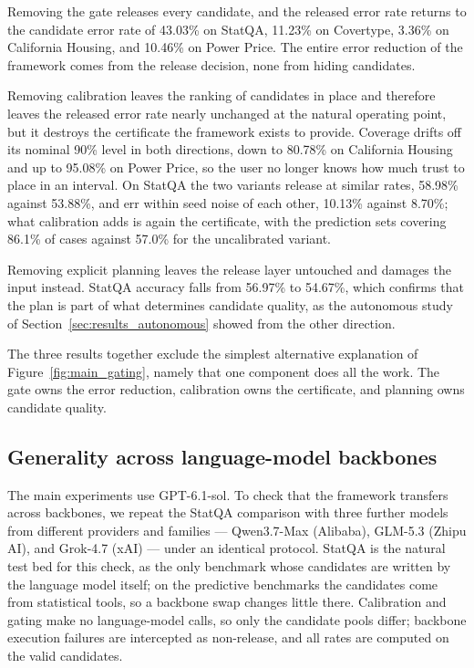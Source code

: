 \documentclass[preprint,12pt,authoryear]{elsarticle}
\begin{document}
Removing the gate releases every candidate, and the released error rate returns to the candidate error rate of 43.03\% on StatQA, 11.23\% on Covertype, 3.36\% on California Housing, and 10.46\% on Power Price. The entire error reduction of the framework comes from the release decision, none from hiding candidates.

Removing calibration leaves the ranking of candidates in place and therefore leaves the released error rate nearly unchanged at the natural operating point, but it destroys the certificate the framework exists to provide.
Coverage drifts off its nominal 90\% level in both directions, down to 80.78\% on California Housing and up to 95.08\% on Power Price, so the user no longer knows how much trust to place in an interval.
On StatQA the two variants release at similar rates, 58.98\% against 53.88\%, and err within seed noise of each other, 10.13\% against 8.70\%; what calibration adds is again the certificate, with the prediction sets covering 86.1\% of cases against 57.0\% for the uncalibrated variant.

Removing explicit planning leaves the release layer untouched and damages the input instead. StatQA accuracy falls from 56.97\% to 54.67\%, which confirms that the plan is part of what determines candidate quality, as the autonomous study of Section~\ref{sec:results_autonomous} showed from the other direction.

The three results together exclude the simplest alternative explanation of Figure~\ref{fig:main_gating}, namely that one component does all the work. The gate owns the error reduction, calibration owns the certificate, and planning owns candidate quality.


\subsection{Generality across language-model backbones}
\label{sec:results_multillm}


The main experiments use GPT-6.1-sol. To check that the framework transfers across backbones, we repeat the StatQA comparison with three further models from different providers and families --- Qwen3.7-Max (Alibaba), GLM-5.3 (Zhipu AI), and Grok-4.7 (xAI) --- under an identical protocol. StatQA is the natural test bed for this check, as the only benchmark whose candidates are written by the language model itself; on the predictive benchmarks the candidates come from statistical tools, so a backbone swap changes little there. Calibration and gating make no language-model calls, so only the candidate pools differ; backbone execution failures are intercepted as non-release, and all rates are computed on the valid candidates.
\end{document}
